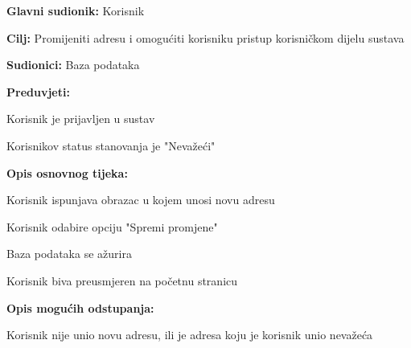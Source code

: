 					
					\noindent {}
                    \begin{packed_item}
    
                        \item \textbf{Glavni sudionik: }Korisnik
                        \item  \textbf{Cilj:} Promijeniti adresu i omogućiti korisniku pristup korisničkom dijelu sustava
                        \item  \textbf{Sudionici:} Baza podataka
                        \item  \textbf{Preduvjeti:}
						\item[] \begin{packed_enum}
							\item Korisnik je prijavljen u sustav
							\item Korisnikov status stanovanja je "Nevažeći"
						\end{packed_enum}
                        \item  \textbf{Opis osnovnog tijeka:}
                        
                        \item[] \begin{packed_enum}
    
                            \item Korisnik ispunjava obrazac u kojem unosi novu adresu
                            \item Korisnik odabire opciju "Spremi promjene"
                            \item Baza podataka se ažurira
                            \item Korisnik biva preusmjeren na početnu stranicu
                        \end{packed_enum}
                        
                        \item  \textbf{Opis mogućih odstupanja:}
                        
                        \item[] \begin{packed_item}
    
                            \item[2.a] Korisnik nije unio novu adresu, ili je adresa koju je korisnik unio nevažeća
                            \item[] \begin{packed_enum}
                                

\end{packed_enum}
\end{packed_item}
\end{packed_item}
